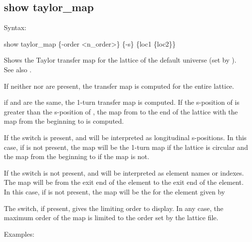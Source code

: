 {{{{{{%

\subsection{show taylor_map}
\label{s:show.taylor}

Syntax:
\begin{example}
  show taylor_map \{-order <n_order>\} \{-s\} \{loc1 \{loc2\}\}
\end{example}

Shows the Taylor transfer map for the  lattice of the default universe (set by
).  See also .

If neither  nor  are present, the transfer map is computed for the
entire lattice.

if  and  are the same, the 1-turn transfer map is computed. If the
s-position of  is greater than the s-position of , the map from
 to the end of the lattice with the map from the beginning to  is
computed.

If the  switch is present,  and  will be interpreted as
longitudinal s-positions. In this case, if  is not present, the map will be the
1-turn map if the lattice is circular and the map from the beginning to  if the
map is not.

If the  switch is not present,  and  will be interpreted as
element names or indexes. The map will be from the exit end of the  element to
the exit end of the  element. In this case, if  is not present, the map
will be the for the element given by 

The  switch, if present, gives the limiting order to display. In any case, the
maximum order of the map is limited to the order set by the lattice file.

Examples:


}}}}}}
